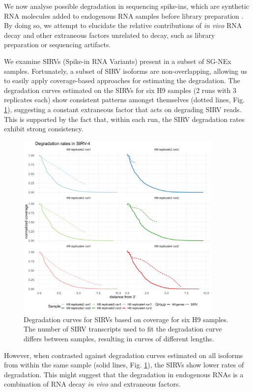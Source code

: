 We now analyse possible degradation in sequencing spike-ins, which are synthetic RNA molecules added to endogenous RNA samples before library preparation \cite{Lexogen20201}. By doing so, we attempt to elucidate the relative contributions of \textit{in vivo} RNA decay and other extraneous factors unrelated to decay, such as library preparation or sequencing artifacts.

We examine SIRVs (Spike-in RNA Variants) present in a subset of SG-NEx samples. Fortunately, a subset of SIRV isoforms are non-overlapping, allowing us to easily apply coverage-based approaches for estimating the degradation. The degradation curves estimated on the SIRVs for six H9 samples (2 runs with 3 replicates each) show consistent patterns amongst themselves (dotted lines, Fig. \ref{fig:cov-spike}), suggesting a constant extraneous factor that acts on degrading SIRV reads. This is supported by the fact that, within each run, the SIRV degradation rates exhibit strong consistency.

\begin{figure}[H]
    \centering
    \includegraphics[width=0.9\textwidth]{figures/sec-2-cov-spike.png}
    \caption[Degradation curves for SIRVs based on coverage]{Degradation curves for SIRVs based on coverage for six H9 samples. The number of SIRV transcripts used to fit the degradation curve differs between samples, resulting in curves of different lengths.}
    \label{fig:cov-spike}
\end{figure}

However, when contrasted against degradation curves estimated on all isoforms from within the same sample (solid lines, Fig. \ref{fig:cov-spike}), the SIRVs show lower rates of degradation. This might suggest that the degradation in endogenous RNAs is a combination of RNA decay \textit{in vivo} and extraneous factors. 

